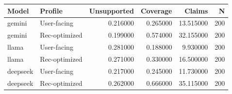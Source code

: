 \begin{tabular}{llrrrr}
\toprule
Model & Profile & Unsupported & Coverage & Claims & N \\
\midrule
gemini & User-facing & 0.216000 & 0.265000 & 13.515000 & 200 \\
gemini & Rec-optimized & 0.199000 & 0.574000 & 32.155000 & 200 \\
llama & User-facing & 0.281000 & 0.188000 & 9.930000 & 200 \\
llama & Rec-optimized & 0.271000 & 0.330000 & 16.500000 & 200 \\
deepseek & User-facing & 0.217000 & 0.245000 & 11.730000 & 200 \\
deepseek & Rec-optimized & 0.262000 & 0.666000 & 35.115000 & 200 \\
\bottomrule
\end{tabular}
